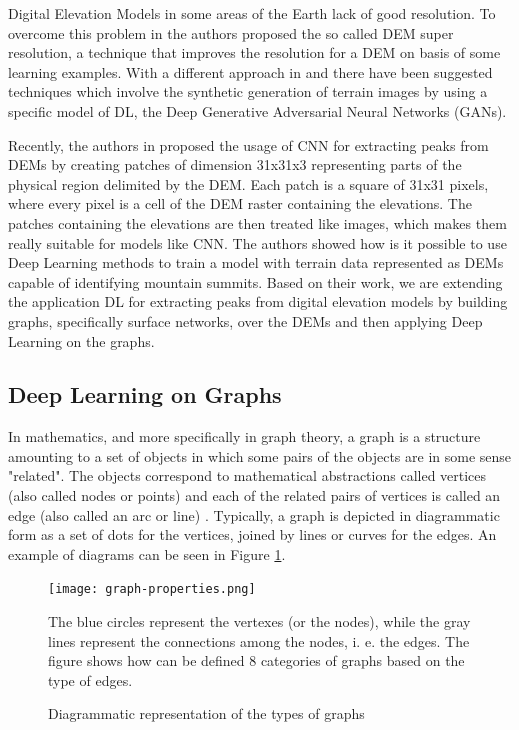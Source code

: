Digital Elevation Models in some areas of the Earth lack of good resolution. To overcome this problem in \cite{chen2016convolutional} the authors proposed the so called DEM super resolution, a technique that improves the resolution for a DEM on basis of some learning examples. With a different approach in \cite{guerin2017interactive} and \cite{beckham2017step} there have been suggested techniques which involve the synthetic generation of terrain images by using a specific model of DL, the Deep Generative Adversarial Neural Networks (GANs). 

Recently, the authors in \cite{AI3D-DL-PE} proposed the usage of CNN for extracting peaks from DEMs by creating patches of dimension 31x31x3 representing parts of the physical region delimited by the DEM. Each patch is a square of 31x31 pixels, where every pixel is a cell of the DEM raster containing the elevations. The patches containing the elevations are then treated like images, which makes them really suitable for models like CNN. The authors showed how is it possible to use Deep Learning methods to train a model with terrain data represented as DEMs capable of identifying mountain summits. Based on their work, we are extending the application DL for extracting peaks from digital elevation models by building graphs, specifically surface networks, over the DEMs and then applying Deep Learning on the graphs.

\subsection{Deep Learning on Graphs} \label{deep_learning_on_graphs}
In mathematics, and more specifically in graph theory, a graph is a structure amounting to a set of objects in which some pairs of the objects are in some sense "related". The objects correspond to mathematical abstractions called vertices (also called nodes or points) and each of the related pairs of vertices is called an edge (also called an arc or line) \cite{trudeau1993introduction}. Typically, a graph is depicted in diagrammatic form as a set of dots for the vertices, joined by lines or curves for the edges. An example of diagrams can be seen in Figure \ref{fig:graph}. 
\begin{figure}

\texttt{[image: graph-properties.png]}
\caption{Diagrammatic representation of the types of graphs}
The blue circles represent the vertexes (or the nodes), while the gray lines represent the connections among the nodes, i. e. the edges. The figure shows how can be defined 8 categories of graphs based on the type of edges.
\label{fig:graph}
\end{figure}

